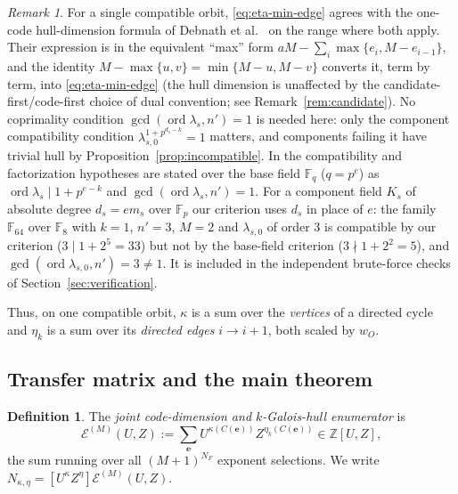 \documentclass[preprint,12pt,a4paper]{elsarticle}
\newcommand{\F}{\mathbb F}
\newcommand{\Epoly}{\mathscr E}
\theoremstyle{definition}
\newtheorem{definition}[theorem]{Definition}
\theoremstyle{remark}
\newtheorem{remark}[theorem]{Remark}
\begin{document}
\begin{remark}\label{rem:debnath-agreement}
For a single compatible orbit, \eqref{eq:eta-min-edge} agrees with the
one-code hull-dimension formula of Debnath et al.\
\cite{debnathAffine2026} on the range where both apply. Their expression is
in the equivalent ``max'' form
$aM-\sum_i\max\{e_i,M-e_{i-1}\}$, and the identity
$M-\max\{u,v\}=\min\{M-u,M-v\}$ converts it, term by term, into
\eqref{eq:eta-min-edge} (the hull dimension is unaffected by the
candidate-first/code-first choice of dual convention; see
Remark~\ref{rem:candidate}). No coprimality condition
$\gcd(\operatorname{ord}\lambda_s,n')=1$ is needed here: only the component
compatibility condition $\lambda_{s,0}^{1+p^{d_s-k}}=1$ matters, and
components failing it have trivial hull by
Proposition~\ref{prop:incompatible}.  In \cite{debnathAffine2026} the
compatibility and factorization hypotheses are stated over the base field
$\F_q$ ($q=p^e$) as $\operatorname{ord}\lambda_s\mid 1+p^{e-k}$ and
$\gcd(\operatorname{ord}\lambda_s,n')=1$.  For a component field $K_s$ of
absolute degree $d_s=em_s$ over $\F_p$ our criterion uses $d_s$ in place of
$e$: the
family $\F_{64}$ over $\F_8$ with $k=1$, $n'=3$, $M=2$ and
$\lambda_{s,0}$ of order $3$ is compatible by our criterion
($3\mid 1+2^{5}=33$) but not by the base-field criterion ($3\nmid
1+2^{2}=5$), and $\gcd(\operatorname{ord}\lambda_{s,0},n')=3\neq1$.  It is
included in the independent brute-force checks of
Section~\ref{sec:verification}.
\end{remark}

Thus, on one compatible orbit, $\kappa$ is a sum over the \emph{vertices} of a
directed cycle and $\eta_k$ is a sum over its \emph{directed edges}
$i\to i+1$, both scaled by $w_O$.

\subsection{Transfer matrix and the main theorem}\label{sec:transfer}

\begin{definition}\label{def:enumerator}
The \emph{joint code-dimension and $k$-Galois-hull enumerator} is
\[
\Epoly^{(M)}(U,Z)
   :=\sum_{\mathbf{e}}U^{\kappa(C(\mathbf{e}))}
                      Z^{\eta_k(C(\mathbf{e}))}
   \in\mathbb{Z}[U,Z],
\]
the sum running over all $(M+1)^{N_F}$ exponent selections.  We write
$N_{\kappa,\eta}=[U^\kappa Z^\eta]\Epoly^{(M)}(U,Z)$.
\end{definition}
\end{document}
